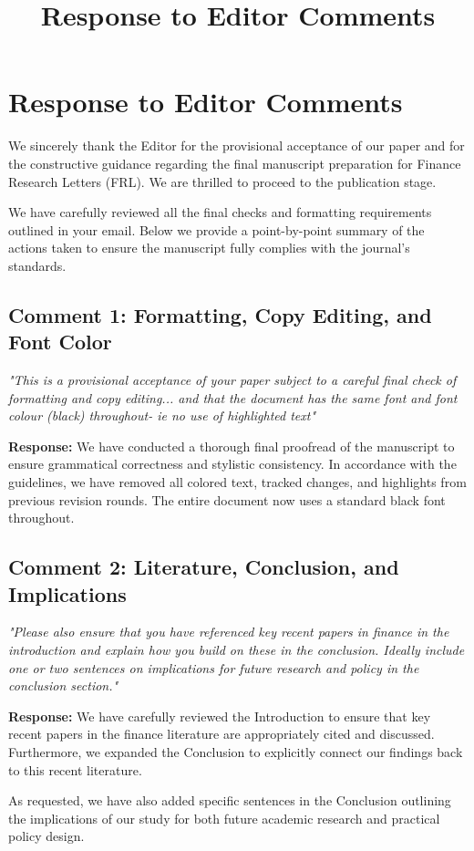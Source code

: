\documentclass[12pt]{article}
\title{Response to Editor Comments}
\author{}
\date{}
\begin{document}
\maketitle

\section*{Response to Editor Comments}

We sincerely thank the Editor for the provisional acceptance of our paper and for the constructive guidance regarding the final manuscript preparation for Finance Research Letters (FRL). We are thrilled to proceed to the publication stage. 

We have carefully reviewed all the final checks and formatting requirements outlined in your email. Below we provide a point-by-point summary of the actions taken to ensure the manuscript fully complies with the journal's standards.

\subsection*{Comment 1: Formatting, Copy Editing, and Font Color}
\textit{"This is a provisional acceptance of your paper subject to a careful final check of formatting and copy editing... and that the document has the same font and font colour (black) throughout- ie no use of highlighted text"}

\begin{highlightbox}
\textbf{Response:} We have conducted a thorough final proofread of the manuscript to ensure grammatical correctness and stylistic consistency. In accordance with the guidelines, we have removed all colored text, tracked changes, and highlights from previous revision rounds. The entire document now uses a standard black font throughout.
\end{highlightbox}

\subsection*{Comment 2: Literature, Conclusion, and Implications}
\textit{"Please also ensure that you have referenced key recent papers in finance in the introduction and explain how you build on these in the conclusion. Ideally include one or two sentences on implications for future research and policy in the conclusion section."}

\begin{highlightbox}
\textbf{Response:} We have carefully reviewed the Introduction to ensure that key recent papers in the finance literature are appropriately cited and discussed. Furthermore, we expanded the Conclusion to explicitly connect our findings back to this recent literature. 

As requested, we have also added specific sentences in the Conclusion outlining the implications of our study for both future academic research and practical policy design.
\end{highlightbox}
\end{document}
